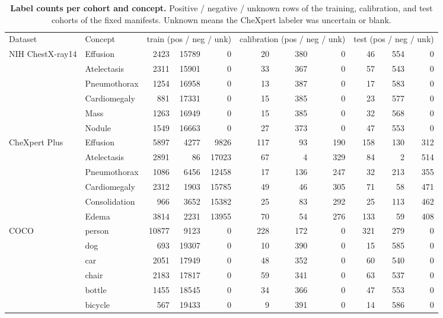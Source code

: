 \documentclass{article}
\begin{document}
\begin{table}[h]
\centering
\scriptsize
\setlength{\tabcolsep}{4pt}
\caption{\textbf{Label counts per cohort and concept.} Positive / negative / unknown rows of the training, calibration, and test cohorts of the fixed manifests. Unknown means the CheXpert labeler was uncertain or blank.}
\label{tab:cf-prevalence}
\begin{tabular}{llrrrrrrrrr}
\toprule
Dataset & Concept & \multicolumn{3}{c}{train (pos / neg / unk)} & \multicolumn{3}{c}{calibration (pos / neg / unk)} & \multicolumn{3}{c}{test (pos / neg / unk)} \\
\cmidrule(lr){3-5}\cmidrule(lr){6-8}\cmidrule(lr){9-11}
NIH ChestX-ray14 & Effusion & 2423 & 15789 & 0 & 20 & 380 & 0 & 46 & 554 & 0 \\
 & Atelectasis & 2311 & 15901 & 0 & 33 & 367 & 0 & 57 & 543 & 0 \\
 & Pneumothorax & 1254 & 16958 & 0 & 13 & 387 & 0 & 17 & 583 & 0 \\
 & Cardiomegaly & 881 & 17331 & 0 & 15 & 385 & 0 & 23 & 577 & 0 \\
 & Mass & 1263 & 16949 & 0 & 15 & 385 & 0 & 32 & 568 & 0 \\
 & Nodule & 1549 & 16663 & 0 & 27 & 373 & 0 & 47 & 553 & 0 \\
\addlinespace
CheXpert Plus & Effusion & 5897 & 4277 & 9826 & 117 & 93 & 190 & 158 & 130 & 312 \\
 & Atelectasis & 2891 & 86 & 17023 & 67 & 4 & 329 & 84 & 2 & 514 \\
 & Pneumothorax & 1086 & 6456 & 12458 & 17 & 136 & 247 & 32 & 213 & 355 \\
 & Cardiomegaly & 2312 & 1903 & 15785 & 49 & 46 & 305 & 71 & 58 & 471 \\
 & Consolidation & 966 & 3652 & 15382 & 25 & 83 & 292 & 25 & 113 & 462 \\
 & Edema & 3814 & 2231 & 13955 & 70 & 54 & 276 & 133 & 59 & 408 \\
\addlinespace
COCO & person & 10877 & 9123 & 0 & 228 & 172 & 0 & 321 & 279 & 0 \\
 & dog & 693 & 19307 & 0 & 10 & 390 & 0 & 15 & 585 & 0 \\
 & car & 2051 & 17949 & 0 & 48 & 352 & 0 & 60 & 540 & 0 \\
 & chair & 2183 & 17817 & 0 & 59 & 341 & 0 & 63 & 537 & 0 \\
 & bottle & 1455 & 18545 & 0 & 34 & 366 & 0 & 47 & 553 & 0 \\
 & bicycle & 567 & 19433 & 0 & 9 & 391 & 0 & 14 & 586 & 0 \\
\bottomrule
\end{tabular}
\end{table}
\end{document}

